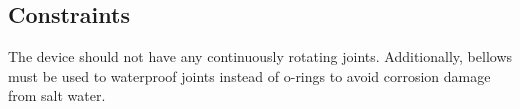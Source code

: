 \subsection{Constraints}

The device should not have any continuously rotating joints. 
Additionally, bellows must be used to waterproof joints instead of o-rings to avoid corrosion damage from salt water.